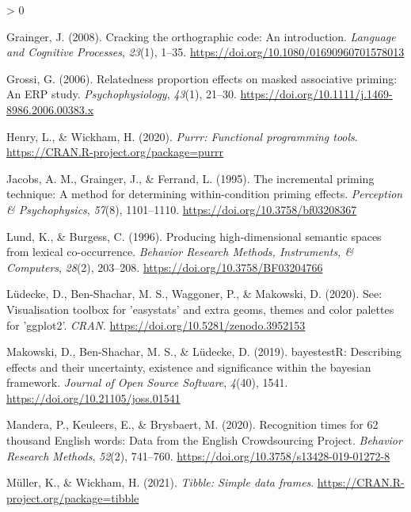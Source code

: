 \documentclass[
  english,
  man,floatsintext]{apa6}
\newlength{\cslhangindent}
\newenvironment{CSLReferences}[2] %
 {%
  \setlength{\parindent}{0pt}
  \ifodd #1 \everypar{\setlength{\hangindent}{\cslhangindent}}\ignorespaces\fi
  \ifnum #2 > 0
  \setlength{\parskip}{#2\baselineskip}
  \fi
 }%
 {}
\begin{document}
\begin{CSLReferences}{1}{0}
\leavevmode\hypertarget{ref-grainger2008cracking}{}%
Grainger, J. (2008). Cracking the orthographic code: An introduction. \emph{Language and Cognitive Processes}, \emph{23}(1), 1--35. \url{https://doi.org/10.1080/01690960701578013}

\leavevmode\hypertarget{ref-grossi2006relatedness}{}%
Grossi, G. (2006). Relatedness proportion effects on masked associative priming: An {ERP} study. \emph{Psychophysiology}, \emph{43}(1), 21--30. \url{https://doi.org/10.1111/j.1469-8986.2006.00383.x}

\leavevmode\hypertarget{ref-R-purrr}{}%
Henry, L., \& Wickham, H. (2020). \emph{Purrr: Functional programming tools}. \url{https://CRAN.R-project.org/package=purrr}

\leavevmode\hypertarget{ref-Jacobs_1995}{}%
Jacobs, A. M., Grainger, J., \& Ferrand, L. (1995). The incremental priming technique: A method for determining within-condition priming effects. \emph{Perception {\&} Psychophysics}, \emph{57}(8), 1101--1110. \url{https://doi.org/10.3758/bf03208367}

\leavevmode\hypertarget{ref-lund1996}{}%
Lund, K., \& Burgess, C. (1996). Producing high-dimensional semantic spaces from lexical co-occurrence. \emph{Behavior Research Methods, Instruments, \& Computers}, \emph{28}(2), 203--208. \url{https://doi.org/10.3758/BF03204766}

\leavevmode\hypertarget{ref-R-see}{}%
Lüdecke, D., Ben-Shachar, M. S., Waggoner, P., \& Makowski, D. (2020). See: Visualisation toolbox for 'easystats' and extra geoms, themes and color palettes for 'ggplot2'. \emph{CRAN}. \url{https://doi.org/10.5281/zenodo.3952153}

\leavevmode\hypertarget{ref-R-bayestestR}{}%
Makowski, D., Ben-Shachar, M. S., \& Lüdecke, D. (2019). bayestestR: Describing effects and their uncertainty, existence and significance within the bayesian framework. \emph{Journal of Open Source Software}, \emph{4}(40), 1541. \url{https://doi.org/10.21105/joss.01541}

\leavevmode\hypertarget{ref-mandera2020}{}%
Mandera, P., Keuleers, E., \& Brysbaert, M. (2020). Recognition times for 62 thousand English words: Data from the English Crowdsourcing Project. \emph{Behavior Research Methods}, \emph{52}(2), 741--760. \url{https://doi.org/10.3758/s13428-019-01272-8}

\leavevmode\hypertarget{ref-R-tibble}{}%
Müller, K., \& Wickham, H. (2021). \emph{Tibble: Simple data frames}. \url{https://CRAN.R-project.org/package=tibble}


\end{CSLReferences}
\end{document}
